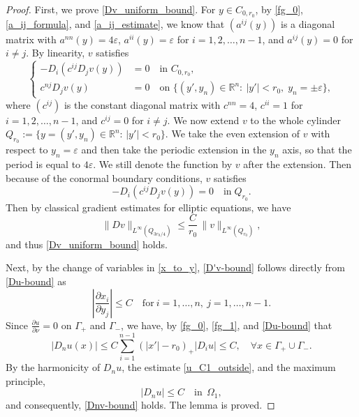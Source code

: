 \documentclass[10pt,a4paper]{amsart}
\begin{document}
\begin{proof}
First, we prove \eqref{Dv_uniform_bound}. For $y\in C_{0,r_0}$, by \eqref{fg_0}, \eqref{a_ij_formula}, and \eqref{a_ij_estimate}, we know that $(a^{ij}(y))$ is a diagonal matrix with $a^{nn}(y)=4\varepsilon$, $a^{ii}(y)=\varepsilon$ for $i=1,2,\ldots,n-1$, and $a^{ij}(y)=0$ for $i\neq j$. 
By linearity, $v$ satisfies \begin{equation*}%
\left\{
\begin{aligned}
-D_i(c^{ij} D_j v(y)) &=0 \quad \mbox{in } C_{0,r_0},\\
c^{nj} D_j v(y) &= 0 \quad \mbox{on } \{(y',y_n)\in \mathbb{R}^n: ~|y'|<r_0,\; y_n=\pm \varepsilon\},
\end{aligned}
\right.
\end{equation*}
where $(c^{ij})$ is the constant diagonal matrix with $c^{nn}=4$, $c^{ii}=1$ for $i=1,2,\ldots,n-1$, and $c^{ij}=0$ for $i\neq j$. 
We now extend $v$ to the whole cylinder $Q_{r_0}:=\{y=(y', y_n)\in \mathbb{R}^n: \,|y'|<r_0\}$.
We take the even extension of $v$ with respect to ${y}_n = \varepsilon$ and then take the periodic extension in the $y_n$ axis, so that the period is equal to $4\varepsilon$. We still denote the function by $v$ after the extension. Then because of the conormal boundary conditions, $v$ satisfies
\begin{equation*}%
-D_i(c^{ij} D_j v(y)) =0 \quad  \text{in} \; Q_{r_0}.
\end{equation*}
Then by classical gradient estimates for elliptic equations, we have
\begin{equation*}
    \|Dv\|_{L^\infty(Q_{3r_0/4})} \le \frac{C}{r_0}\,\|v\|_{L^\infty(Q_{r_0})},
\end{equation*}
and thus \eqref{Dv_uniform_bound} holds.

Next, by the change of variables in \eqref{x_to_y}, \eqref{D'v-bound} follows directly from \eqref{Du-bound} as
$$
\left| \frac{\partial x_i}{\partial y_j} \right| \le C \quad \mbox{for}~ i = 1,\ldots,n,~ j=1,\ldots, n-1.
$$
Since $\frac{\partial u}{\partial \nu} = 0$ on $\Gamma_+$ and $\Gamma_-$, we have, by
\eqref{fg_0}, \eqref{fg_1}, and \eqref{Du-bound} that
$$|D_n u(x)| \le  C\sum_{i = 1}^{n-1}(|x'|-r_0)_+ |D_i u|  \le C, \quad \forall x \in \Gamma_+ \cup \Gamma_-.$$
By the harmonicity of $D_n u$, the estimate \eqref{u_C1_outside}, and the maximum principle,
\begin{equation*}
|D_n u| \le C \quad \mbox{in}~~\Omega_{1},
\end{equation*}
and consequently, \eqref{Dnv-bound} holds.
The lemma is proved.
\end{proof}
\end{document}
